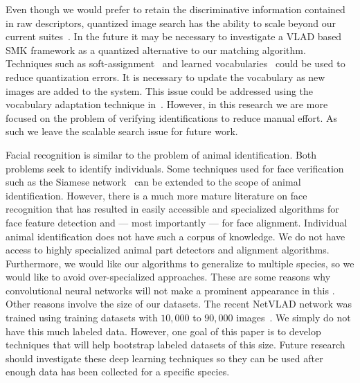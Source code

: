         Even though we would prefer to retain the discriminative
          information contained in raw descriptors, quantized image
          search has the ability to scale beyond our current
          suites~\cite{chum_fast_2012, perronnin_largescale_2010-1,
          tolias_image_2015}.
        In the future it may be necessary to investigate a VLAD based
          SMK framework as a quantized alternative to our matching
          algorithm.
        Techniques such as soft-assignment~\cite{philbin_lost_2008} and
          learned vocabularies~\cite{mikulik_learning_2010} could be used
          to reduce quantization errors.
        It is necessary to update the vocabulary as new images are
          added to the system.
        This issue could be addressed using the vocabulary adaptation
          technique in~\cite{arandjelovic_all_2013}.
        However, in this research we are more focused on the problem of
          verifying identifications to reduce manual effort.
        As such we leave the scalable search issue for future work.


        Facial recognition is similar to the problem of animal
          identification.
        Both problems seek to identify individuals.
        Some techniques used for face verification such as the Siamese
          network~\cite{chopra_learning_2005, taigman_deepface_2014} can
          be extended to the scope of animal identification.
        However, there is a much more mature literature on face
          recognition that has resulted in easily accessible and
          specialized algorithms for face feature detection and --- most
          importantly --- for face alignment.
        Individual animal identification does not have such a corpus of
          knowledge.
        We do not have access to highly specialized animal part
          detectors and alignment algorithms.
        Furthermore, we would like our algorithms to generalize to
          multiple species, so we would like to avoid over-specialized
          approaches.
        These are some reasons why convolutional neural networks will
          not make a prominent appearance in this \thesis{}.
        Other reasons involve the size of our datasets.
        The recent NetVLAD network was trained using training datasets
          with $10,000$ to $90,000$
          images~\cite{arandjelovic_netvlad_2015}.
        We simply do not have this much labeled data.
        However, one goal of this paper is to develop techniques that
          will help bootstrap labeled datasets of this size.
        Future research should investigate these deep learning
          techniques so they can be used after enough data has been
          collected for a specific species.

